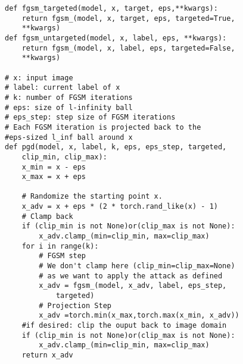 \begin{lstlisting}[style=mypython]
def fgsm_targeted(model, x, target, eps,**kwargs):
    return fgsm_(model, x, target, eps, targeted=True, 
    **kwargs)
def fgsm_untargeted(model, x, label, eps, **kwargs):
    return fgsm_(model, x, label, eps, targeted=False, 
    **kwargs)

# x: input image
# label: current label of x
# k: number of FGSM iterations
# eps: size of l-infinity ball
# eps_step: step size of FGSM iterations
# Each FGSM iteration is projected back to the
#eps-sized l_inf ball around x
def pgd(model, x, label, k, eps, eps_step, targeted, 
    clip_min, clip_max):
    x_min = x - eps
    x_max = x + eps
    
    # Randomize the starting point x.
    x_adv = x + eps * (2 * torch.rand_like(x) - 1)
    # Clamp back
    if (clip_min is not None)or(clip_max is not None):
        x_adv.clamp_(min=clip_min, max=clip_max)
    for i in range(k):
        # FGSM step
        # We don't clamp here (clip_min=clip_max=None) 
        # as we want to apply the attack as defined
        x_adv = fgsm_(model, x_adv, label, eps_step, 
            targeted)
        # Projection Step
        x_adv =torch.min(x_max,torch.max(x_min, x_adv))
    #if desired: clip the ouput back to image domain
    if (clip_min is not None)or(clip_max is not None):
        x_adv.clamp_(min=clip_min, max=clip_max)
    return x_adv


\end{lstlisting}
